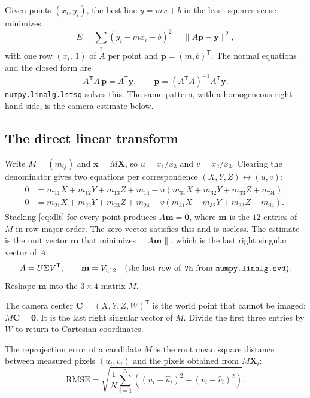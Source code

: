 \documentclass[11pt]{article}
\begin{document}
Given points $(x_i,y_i)$, the best line $y=mx+b$ in the least-squares sense minimizes
\begin{equation}
E=\sum_i (y_i-mx_i-b)^2=\|A\mathbf{p}-\mathbf{y}\|^2,
\end{equation}
with one row $(x_i,\,1)$ of $A$ per point and $\mathbf{p}=(m,b)^{\mathsf T}$. The normal equations and the closed form are
\begin{equation}
A^{\mathsf T}A\,\mathbf{p}=A^{\mathsf T}\mathbf{y},
\qquad
\mathbf{p}=(A^{\mathsf T}A)^{-1}A^{\mathsf T}\mathbf{y}.
\end{equation}
\texttt{numpy.linalg.lstsq} solves this. The same pattern, with a homogeneous right-hand side, is the camera estimate below.

\subsection{The direct linear transform}

Write $M=(m_{ij})$ and $\mathbf{x}=M\mathbf{X}$, so $u=x_1/x_3$ and $v=x_2/x_3$. Clearing the denominator gives two equations per correspondence $(X,Y,Z)\leftrightarrow(u,v)$:
\begin{align}
\begin{aligned}
0&=m_{11}X+m_{12}Y+m_{13}Z+m_{14}-u(m_{31}X+m_{32}Y+m_{33}Z+m_{34}),\\
0&=m_{21}X+m_{22}Y+m_{23}Z+m_{24}-v(m_{31}X+m_{32}Y+m_{33}Z+m_{34}).
\end{aligned}
\label{eq:dlt}
\end{align}
Stacking \eqref{eq:dlt} for every point produces $A\mathbf{m}=\mathbf{0}$, where $\mathbf{m}$ is the $12$ entries of $M$ in row-major order. The zero vector satisfies this and is useless. The estimate is the unit vector $\mathbf{m}$ that minimizes $\|A\mathbf{m}\|$, which is the last right singular vector of $A$:
\begin{equation}
A=U\Sigma V^{\mathsf T},
\qquad
\mathbf{m}=V_{:,12}
\quad\text{(the last row of \texttt{Vh} from \texttt{numpy.linalg.svd}).}
\end{equation}
Reshape $\mathbf{m}$ into the $3\times 4$ matrix $M$.

The camera center $\mathbf{C}=(X,Y,Z,W)^{\mathsf T}$ is the world point that cannot be imaged: $M\mathbf{C}=\mathbf{0}$. It is the last right singular vector of $M$. Divide the first three entries by $W$ to return to Cartesian coordinates.

The reprojection error of a candidate $M$ is the root mean square distance between measured pixels $(u_i,v_i)$ and the pixels obtained from $M\mathbf{X}_i$:
\begin{equation}
\mathrm{RMSE}
=
\sqrt{\frac{1}{N}\sum_{i=1}^{N}
\left((u_i-\hat u_i)^2+(v_i-\hat v_i)^2\right)}.
\end{equation}
\end{document}
